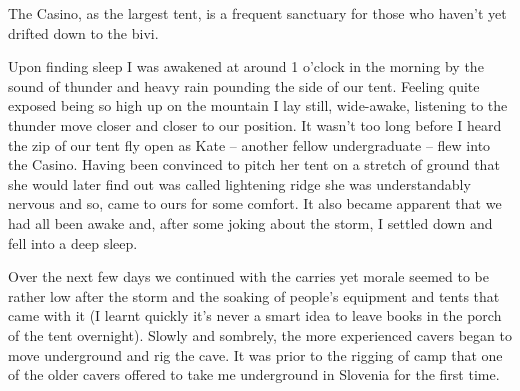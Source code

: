 \begin{marginfigure}
\checkoddpage \ifoddpage \forcerectofloat \else \forceversofloat \fi
\centering
 \caption{The Casino, as the largest tent, is a frequent sanctuary for those who haven't yet drifted down to the bivi. }
 \label{playing cards}
\end{marginfigure}


Upon finding sleep I was awakened at around 1
o'clock in the morning by the sound of thunder and heavy rain pounding
the side of our tent. Feeling quite exposed being so high up on the
mountain I lay still, wide-awake, listening to the thunder move closer
and closer to our position. It wasn't too long before I heard the zip of
our tent fly open as Kate -- another fellow undergraduate -- flew into the
Casino. Having been convinced to pitch her tent on a stretch of ground
that she would later find out was called lightening ridge she was
understandably nervous and so, came to ours for some comfort. It also
became apparent that we had all been awake and, after some joking about
the storm, I settled down and fell into a deep sleep.

Over the next few days we continued with the carries yet morale seemed to
be rather low after the storm and the soaking of people's equipment and
tents that came with it (I learnt quickly it's never a smart idea to
leave books in the porch of the tent overnight). Slowly and sombrely,
the more experienced cavers began to move underground and rig the cave.
It was prior to the rigging of camp that one of the older cavers offered
to take me underground in Slovenia for the first time.

